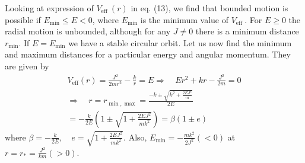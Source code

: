 \documentclass[conference]{IEEEtran}
\begin{document}
\subsubsection{}
Looking at expression of $V_{\text {eff }}(r)$ in eq. (13), we find that bounded motion is possible if $E_{\min } \leq E<0$, where $E_{\min }$ is the minimum value of $V_{\text {eff }}$. For $E \geq 0$ the radial motion is unbounded, although for any $J \neq 0$ there is a minimum distance $r_{\min }$. If $E=E_{\min }$ we have a stable circular orbit. Let us now find the minimum and maximum distances for a particular energy and
angular momentum. They are given by \begin{dmath}
\begin{array}{c}
V_{\mathrm{eff}}(r)=\frac{J^{2}}{2 m r^{2}}-\frac{k}{r}=E \Rightarrow \quad E r^{2}+k r-\frac{J^{2}}{2 m}=0 \\
\Rightarrow \quad r=r_{\min , \max }=\frac{-k \pm \sqrt{k^{2}+\frac{2 E J^{2}}{m}}}{2 E} \\
=-\frac{k}{2 E}\left(1 \pm \sqrt{1+\frac{2 E J^{2}}{m k^{2}}}\right) =\beta(1 \pm e)
\end{array}
\end{dmath} where $\beta=-\frac{k}{2 E}, \quad e=\sqrt{1+\frac{2 E J^{2}}{m k^{2}}}$. Also, $E_{\min }=-\frac{mk^{2}}{2 J^{2}}(<0)$ at $r = r_{*} = \frac{J^{2}}{km}(>0)$. 
\end{document}
